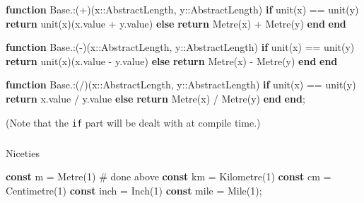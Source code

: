 \documentclass[
]{article}
\makeatletter
\let\oldsubparagraph\subparagraph
\renewcommand{\subparagraph}{
    \@ifstar
      \xxxSubParagraphStar
      \xxxSubParagraphNoStar
  }
\newcommand{\xxxSubParagraphStar}[1]{\oldsubparagraph*{#1}\mbox{}}
\newcommand{\xxxSubParagraphNoStar}[1]{\oldsubparagraph{#1}\mbox{}}
\newenvironment{Shaded}{\begin{snugshade}}{\end{snugshade}}
\newcommand{\BuiltInTok}[1]{\textcolor[rgb]{0.00,0.23,0.31}{#1}}
\newcommand{\CommentTok}[1]{\textcolor[rgb]{0.37,0.37,0.37}{#1}}
\newcommand{\ControlFlowTok}[1]{\textcolor[rgb]{0.00,0.23,0.31}{\textbf{#1}}}
\newcommand{\DataTypeTok}[1]{\textcolor[rgb]{0.68,0.00,0.00}{#1}}
\newcommand{\FloatTok}[1]{\textcolor[rgb]{0.68,0.00,0.00}{#1}}
\newcommand{\FunctionTok}[1]{\textcolor[rgb]{0.28,0.35,0.67}{#1}}
\newcommand{\KeywordTok}[1]{\textcolor[rgb]{0.00,0.23,0.31}{\textbf{#1}}}
\newcommand{\NormalTok}[1]{\textcolor[rgb]{0.00,0.23,0.31}{#1}}
\newcommand{\OperatorTok}[1]{\textcolor[rgb]{0.37,0.37,0.37}{#1}}
\makeatother
\begin{document}
\begin{Shaded}
\begin{Highlighting}[]
\KeywordTok{function} \BuiltInTok{Base}\NormalTok{.}\OperatorTok{:}\NormalTok{(}\OperatorTok{+}\NormalTok{)(x}\OperatorTok{::}\DataTypeTok{AbstractLength}\NormalTok{, y}\OperatorTok{::}\DataTypeTok{AbstractLength}\NormalTok{)}
   \ControlFlowTok{if} \FunctionTok{unit}\NormalTok{(x) }\OperatorTok{==} \FunctionTok{unit}\NormalTok{(y)}
   \ControlFlowTok{return} \FunctionTok{unit}\NormalTok{(x)(x.value }\OperatorTok{+}\NormalTok{ y.value)}
   \ControlFlowTok{else}
   \ControlFlowTok{return} \FunctionTok{Metre}\NormalTok{(x) }\OperatorTok{+} \FunctionTok{Metre}\NormalTok{(y)}
   \ControlFlowTok{end}
\KeywordTok{end}

\KeywordTok{function} \BuiltInTok{Base}\NormalTok{.}\OperatorTok{:}\NormalTok{(}\OperatorTok{{-}}\NormalTok{)(x}\OperatorTok{::}\DataTypeTok{AbstractLength}\NormalTok{, y}\OperatorTok{::}\DataTypeTok{AbstractLength}\NormalTok{)}
   \ControlFlowTok{if} \FunctionTok{unit}\NormalTok{(x) }\OperatorTok{==} \FunctionTok{unit}\NormalTok{(y)}
   \ControlFlowTok{return} \FunctionTok{unit}\NormalTok{(x)(x.value }\OperatorTok{{-}}\NormalTok{ y.value)}
   \ControlFlowTok{else}
   \ControlFlowTok{return} \FunctionTok{Metre}\NormalTok{(x) }\OperatorTok{{-}} \FunctionTok{Metre}\NormalTok{(y)}
   \ControlFlowTok{end}
\KeywordTok{end}

\KeywordTok{function} \BuiltInTok{Base}\NormalTok{.}\OperatorTok{:}\NormalTok{(}\OperatorTok{/}\NormalTok{)(x}\OperatorTok{::}\DataTypeTok{AbstractLength}\NormalTok{, y}\OperatorTok{::}\DataTypeTok{AbstractLength}\NormalTok{)}
   \ControlFlowTok{if} \FunctionTok{unit}\NormalTok{(x) }\OperatorTok{==} \FunctionTok{unit}\NormalTok{(y)}
   \ControlFlowTok{return}\NormalTok{ x.value }\OperatorTok{/}\NormalTok{ y.value}
   \ControlFlowTok{else}
   \ControlFlowTok{return} \FunctionTok{Metre}\NormalTok{(x) }\OperatorTok{/} \FunctionTok{Metre}\NormalTok{(y)}
   \ControlFlowTok{end}
\KeywordTok{end}\NormalTok{;}
\end{Highlighting}
\end{Shaded}

(Note that the \texttt{if} part will be dealt with at compile time.)

\subparagraph{Niceties}\label{niceties}

\begin{Shaded}
\begin{Highlighting}[]
\KeywordTok{const}\NormalTok{ m }\OperatorTok{=} \FunctionTok{Metre}\NormalTok{(}\FloatTok{1}\NormalTok{) }\CommentTok{\# done above}
\KeywordTok{const}\NormalTok{ km }\OperatorTok{=} \FunctionTok{Kilometre}\NormalTok{(}\FloatTok{1}\NormalTok{)}
\KeywordTok{const}\NormalTok{ cm }\OperatorTok{=} \FunctionTok{Centimetre}\NormalTok{(}\FloatTok{1}\NormalTok{)}
\KeywordTok{const}\NormalTok{ inch }\OperatorTok{=} \FunctionTok{Inch}\NormalTok{(}\FloatTok{1}\NormalTok{)}
\KeywordTok{const}\NormalTok{ mile }\OperatorTok{=} \FunctionTok{Mile}\NormalTok{(}\FloatTok{1}\NormalTok{);}
\end{Highlighting}
\end{Shaded}
\end{document}
